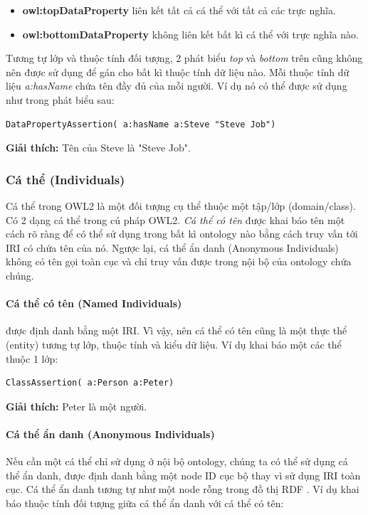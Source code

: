 \begin{itemize}
\item \textbf{owl:topDataProperty} liên kết tất cả cá thể với tất cả các trực nghĩa.
\item \textbf{owl:bottomDataProperty} không liên kết bất kì cá thể với trực nghĩa nào.
\end{itemize}
Tương tự lớp và thuộc tính đối tượng, 2 phát biểu \textit{top} và \textit{bottom} trên cũng không nên được sử dụng để gán cho bất kì thuộc tính dữ liệu nào. Mỗi thuộc tính dữ liệu \textit{a:hasName} chứa tên đầy đủ của mỗi người. Ví dụ nó có thể được sử dụng như trong phát biểu sau:

\begin{verbatim}
DataPropertyAssertion( a:hasName a:Steve "Steve Job") 
\end{verbatim}

\textbf{Giải thích:} Tên của Steve là "Steve Job".

\subsubsection{Cá thể (Individuals)}
Cá thể trong OWL2 là một đối tượng cụ thể thuộc một tập/lớp (domain/class). Có 2 dạng cá thể trong cú pháp OWL2. \textit{Cá thể có tên} được khai báo tên một cách rõ ràng để có thể sử dụng trong bất kì ontology nào bằng cách truy vấn tới IRI có chứa tên của nó. Ngược lại, cá thể ẩn danh (Anonymous Individuals) không có tên gọi toàn cục và chỉ truy vấn được trong nội bộ của ontology chứa chúng.

\paragraph{Cá thể có tên (Named Individuals)} được định danh bằng một IRI. Vì vậy, nên cá thể có tên cũng là một thực thể (entity) tương tự lớp, thuộc tính và kiểu dữ liệu. Ví dụ khai báo một các thể thuộc 1 lớp:


\begin{verbatim}
ClassAssertion( a:Person a:Peter)
\end{verbatim}


\textbf{Giải thích:} Peter là một người.

\paragraph{Cá thể ẩn danh (Anonymous Individuals)} Nếu cần một cá thể chỉ sử dụng ở nội bộ ontology, chúng ta có thể sử dụng cá thể ẩn danh, được định danh bằng một node ID cục bộ thay vì sử dụng IRI toàn cục. Cá thể ẩn danh tương tự như một node rỗng trong đồ thị RDF \cite{rdf_concept}. Ví dụ khai báo thuộc tính đối tượng giữa cá thể ẩn danh với cá thể có tên:

